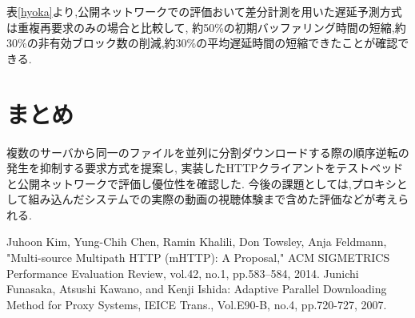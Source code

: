 \documentclass{ltjsarticle}
\begin{document}
表\ref{hyoka}より,公開ネットワークでの評価おいて差分計測を用いた遅延予測方式は重複再要求のみの場合と比較して,
約50\%の初期バッファリング時間の短縮,約30\%の非有効ブロック数の削減,約30\%の平均遅延時間の短縮できたことが確認できる.
\vspace{-8mm}
\section{まとめ}
\vspace{-2mm}
複数のサーバから同一のファイルを並列に分割ダウンロードする際の順序逆転の発生を抑制する要求方式を提案し,
実装したHTTPクライアントをテストベッドと公開ネットワークで評価し優位性を確認した.
今後の課題としては,プロキシとして組み込んだシステムでの実際の動画の視聴体験まで含めた評価などが考えられる.
\vspace{-7mm}
\footnotesize{
\begin{thebibliography}{2}
\vspace{-2mm}
Juhoon Kim, Yung-Chih Chen, Ramin Khalili, Don Towsley, Anja Feldmann,
"Multi-source Multipath HTTP (mHTTP): A Proposal,"
ACM SIGMETRICS Performance Evaluation Review, vol.42, no.1, pp.583--584, 2014.
Junichi Funasaka, Atsushi Kawano, and Kenji Ishida: Adaptive Parallel Downloading Method for Proxy Systems, IEICE Trans., Vol.E90-B, no.4, pp.720-727, 2007.
\end{thebibliography}}
\end{document}
